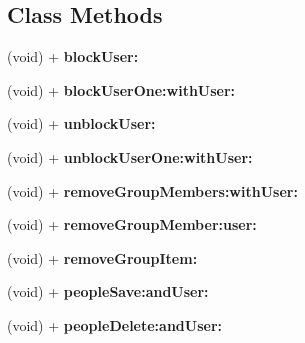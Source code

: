 \subsection*{Class Methods}
\begin{DoxyCompactItemize}
\item 
\hypertarget{interface_e_s_utility_a91bce8959783485ecef676c7e4010daf}{}(void) + {\bfseries block\+User\+:}\label{interface_e_s_utility_a91bce8959783485ecef676c7e4010daf}

\item 
\hypertarget{interface_e_s_utility_a095b35256a1b1bf847e34ec7a4245b85}{}(void) + {\bfseries block\+User\+One\+:with\+User\+:}\label{interface_e_s_utility_a095b35256a1b1bf847e34ec7a4245b85}

\item 
\hypertarget{interface_e_s_utility_a4fb30b6b071c1321cd0ebb3a7afca673}{}(void) + {\bfseries unblock\+User\+:}\label{interface_e_s_utility_a4fb30b6b071c1321cd0ebb3a7afca673}

\item 
\hypertarget{interface_e_s_utility_a0394efada5e371bb6f274921d3c9ac4d}{}(void) + {\bfseries unblock\+User\+One\+:with\+User\+:}\label{interface_e_s_utility_a0394efada5e371bb6f274921d3c9ac4d}

\item 
\hypertarget{interface_e_s_utility_a29d43aaf15b4c5ea65487cfce1957d3f}{}(void) + {\bfseries remove\+Group\+Members\+:with\+User\+:}\label{interface_e_s_utility_a29d43aaf15b4c5ea65487cfce1957d3f}

\item 
\hypertarget{interface_e_s_utility_a9d9936bc2ec0a26b1e097ed57139ce6d}{}(void) + {\bfseries remove\+Group\+Member\+:user\+:}\label{interface_e_s_utility_a9d9936bc2ec0a26b1e097ed57139ce6d}

\item 
\hypertarget{interface_e_s_utility_a0d4b96f708b526b632f804d476a5dee2}{}(void) + {\bfseries remove\+Group\+Item\+:}\label{interface_e_s_utility_a0d4b96f708b526b632f804d476a5dee2}

\item 
\hypertarget{interface_e_s_utility_a81307a9348a065a044775484dce1a5f1}{}(void) + {\bfseries people\+Save\+:and\+User\+:}\label{interface_e_s_utility_a81307a9348a065a044775484dce1a5f1}

\item 
\hypertarget{interface_e_s_utility_ace8a483ffc91e8e585010cdb3b08d52a}{}(void) + {\bfseries people\+Delete\+:and\+User\+:}\label{interface_e_s_utility_ace8a483ffc91e8e585010cdb3b08d52a}


\end{DoxyCompactItemize}
